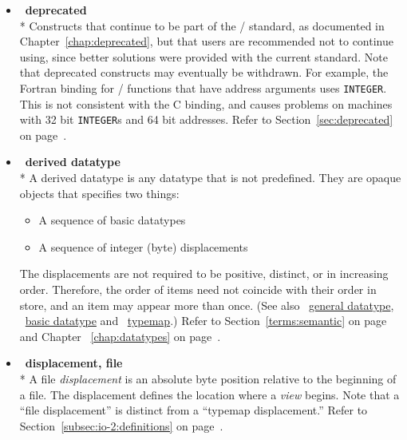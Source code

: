 \begin{itemize}
\label{glossary:deprecated}
\item  ~\hypertarget{glossary:deprecated}{\textbf{deprecated}} \\*
Constructs that continue to be part of the \MPI/ standard, 
as documented in Chapter~\ref{chap:deprecated}, 
but that users are recommended not to continue using, since 
better solutions were provided with the current standard.
Note that deprecated constructs may eventually be withdrawn.
For example, the Fortran binding 
for \mpii/ functions that have address arguments uses {\tt INTEGER}.
This is not consistent with the C binding, and causes problems on
machines with 32 bit {\tt INTEGER}s and 64 bit addresses.
Refer to Section~\ref{sec:deprecated} on page~\pageref{sec:deprecated}.

\label{glossary:derived_datatype}
\item  ~\hypertarget{glossary:derived_datatype}{\textbf{derived datatype}} \\*
A derived datatype is any datatype that is not predefined.
They are opaque objects that specifies two
things:
\begin{itemize}
\item
A sequence of basic datatypes
\item
A sequence of integer (byte) displacements
\end{itemize}
The displacements are not required to be positive, distinct, or
in increasing order. Therefore, the order of items need not
coincide with their order in store, and an item may appear more than
once. (See also ~\hyperlink{glossary:general_datatype}{general datatype}, ~\hyperlink{glossary:basic_datatype}{basic datatype} 
and  ~\hyperlink{glossary:typemap}{typemap}.)
Refer to Section~\ref{terms:semantic} on page~\pageref{terms:semantic} and 
Chapter ~\ref{chap:datatypes} on page~\pageref{chap:datatypes}.

\label{glossary:displacement_file}
\item  ~\hypertarget{glossary:displacement_file}{\textbf{displacement, file}} \\*
A file {\it displacement} is an absolute byte position
relative to the beginning of a file.
The displacement defines the location where a {\it view} begins.
Note that a ``file displacement'' is distinct from a ``typemap displacement.''
Refer to Section~\ref{subsec:io-2:definitions} on page~\pageref{subsec:io-2:definitions}.


\end{itemize}
